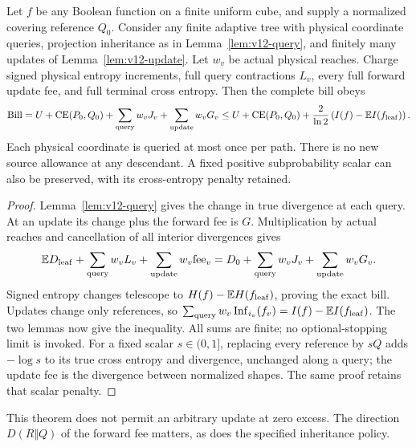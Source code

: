 \begin{theorem}\label{thm:v12-bill}
Let $f$ be any Boolean function on a finite uniform cube, and supply a normalized
covering reference $Q_0$. Consider any finite adaptive tree with physical coordinate
queries, projection inheritance as in Lemma~\ref{lem:v12-query}, and finitely many
updates of Lemma~\ref{lem:v12-update}. Let $w_v$ be actual physical reaches.
Charge signed physical entropy increments, full query contractions $L_v$, every full
forward update fee, and full terminal cross entropy. Then the complete bill obeys
\[
 \mathrm{Bill}=U+\operatorname{CE}(P_0,Q_0)
               +\sum_{\rm query}w_vJ_v+\sum_{\rm update}w_vG_v
 \leq U+\operatorname{CE}(P_0,Q_0)
     +\frac2{\ln2}\left(I(f)-\mathbb E I(f_{\rm leaf})\right).
\]
Each physical coordinate is queried at most once per path. There is no new source
allowance at any descendant. A fixed positive subprobability scalar can also be
preserved, with its cross-entropy penalty retained.
\end{theorem}
\begin{proof}
Lemma~\ref{lem:v12-query} gives the change in true divergence at each query.
At an update its change plus the forward fee is $G$.
Multiplication by actual reaches and cancellation of all interior divergences gives
\[
 \mathbb E D_{\rm leaf}+\sum_{\rm query}w_vL_v
   +\sum_{\rm update}w_v\mathrm{fee}_v
 =D_0+\sum_{\rm query}w_vJ_v+\sum_{\rm update}w_vG_v.
\]
Signed entropy changes telescope to $H(f)-\mathbb EH(f_{\rm leaf})$, proving the
exact bill. Updates change only references, so
$\sum_{\rm query}w_v\operatorname{Inf}_{i_v}(f_v)
=I(f)-\mathbb EI(f_{\rm leaf})$.
The two lemmas now give the inequality. All sums are finite; no optional-stopping
limit is invoked. For a fixed scalar $s\in(0,1]$, replacing every reference by $sQ$
adds $-\log s$ to its true cross entropy and divergence, unchanged along a query;
the update fee is the divergence between normalized shapes. The same proof retains
that scalar penalty.
\end{proof}

This theorem does not permit an arbitrary update at zero excess. The direction
$D(R\Vert Q)$ of the forward fee matters, as does the specified inheritance policy.

